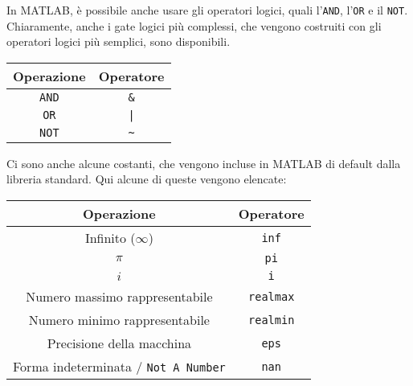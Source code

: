 In MATLAB, è possibile anche usare gli operatori logici, quali l'\texttt{AND}, l'\texttt{OR} e il \texttt{NOT}. Chiaramente, anche i gate logici più complessi, che vengono costruiti con gli operatori logici più semplici, sono disponibili.

\begin{center}
    \begin{tabular}{|c|c|}
        \hline
        \textbf{Operazione} & \textbf{Operatore} \\
        \hline \hline
        \texttt{AND} & \verb|&| \\
        \hline
        \texttt{OR} & \texttt{|} \\
        \hline
        \texttt{NOT} & \verb|~| \\
        \hline
    \end{tabular}
\end{center}

Ci sono anche alcune costanti, che vengono incluse in MATLAB di default dalla libreria standard. Qui alcune di queste vengono elencate:

\begin{center}
    \begin{tabular}{|c|c|}
        \hline
        \textbf{Operazione} & \textbf{Operatore} \\
        \hline\hline
        Infinito ($\infty$) & \texttt{inf} \\
        \hline
        $\pi$ & \texttt{pi} \\
        \hline
        $i$ & \texttt{i} \\
        \hline
        Numero massimo rappresentabile & \texttt{realmax} \\
        \hline
        Numero minimo rappresentabile & \texttt{realmin} \\
        \hline
        Precisione della macchina & \texttt{eps} \\
        \hline
        Forma indeterminata / \texttt{Not A Number} & \texttt{nan} \\
        \hline
    \end{tabular}
\end{center}